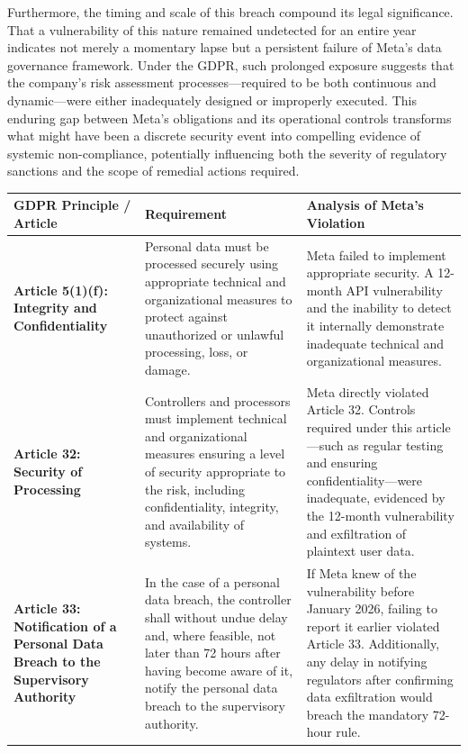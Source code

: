 \documentclass{article}
\begin{document}
Furthermore, the timing and scale of this breach compound its legal significance. That a vulnerability of this nature remained undetected for an entire year indicates not merely a momentary lapse but a persistent failure of Meta's data governance framework. Under the GDPR, such prolonged exposure suggests that the company's risk assessment processes—required to be both continuous and dynamic—were either inadequately designed or improperly executed. This enduring gap between Meta's obligations and its operational controls transforms what might have been a discrete security event into compelling evidence of systemic non-compliance, potentially influencing both the severity of regulatory sanctions and the scope of remedial actions required.
\begin{table}[H]
\centering
\renewcommand{\arraystretch}{1.4}
\begin{tabularx}{\textwidth}{|p{2.5cm}|X|X|}
\hline
\textbf{GDPR Principle / Article} & \textbf{Requirement} & \textbf{Analysis of Meta's Violation} \\
\hline

\textbf{Article 5(1)(f): Integrity and Confidentiality} 
& Personal data must be processed securely using appropriate technical and organizational measures to protect against unauthorized or unlawful processing, loss, or damage. 
& Meta failed to implement appropriate security. A 12-month API vulnerability and the inability to detect it internally demonstrate inadequate technical and organizational measures. \\
\hline

\textbf{Article 32: Security of Processing} 
& Controllers and processors must implement technical and organizational measures ensuring a level of security appropriate to the risk, including confidentiality, integrity, and availability of systems. 
& Meta directly violated Article 32. Controls required under this article—such as regular testing and ensuring confidentiality—were inadequate, evidenced by the 12-month vulnerability and exfiltration of plaintext user data. \\
\hline

\textbf{Article 33: Notification of a Personal Data Breach to the Supervisory Authority} 
& In the case of a personal data breach, the controller shall without undue delay and, where feasible, not later than 72 hours after having become aware of it, notify the personal data breach to the supervisory authority.
& If Meta knew of the vulnerability before January 2026, failing to report it earlier violated Article 33. Additionally, any delay in notifying regulators after confirming data exfiltration would breach the mandatory 72-hour rule. \\
\hline


\end{tabularx}
\end{table}
\end{document}
